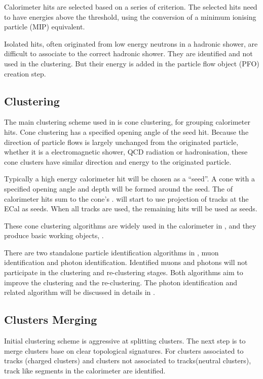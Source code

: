 Calorimeter hits are selected based on a series of criterion. The selected hits need to have energies above the threshold, using the conversion of a minimum ionising particle (MIP) equivalent.

Isolated hits, often originated from low energy neutrons in a hadronic shower, are difficult to associate to the correct hadronic shower. They are identified and not used in the clustering. But their energy is added in the particle flow object (PFO) creation step.

\subsection{Clustering}
\label{sec:pandoraConeClustering}

The main clustering scheme used in \pandora is cone clustering, for grouping calorimeter hits.
Cone clustering has a specified opening angle of the seed hit. Because the direction of particle flows is largely unchanged from the originated particle, whether it is a electromagnetic shower, QCD radiation or hadronisation, these cone clusters have similar direction and energy to the originated particle.

Typically a high energy calorimeter hit will be chosen as a ``seed''. A cone with a specified opening angle and depth will be formed around the seed. The \fourMomentum of calorimeter hits sum to the cone's \fourMomentum. \pandora will start to use projection of tracks at the ECal as seeds. When all tracks are used, the remaining hits will be used as seeds.

These cone clustering algorithms are widely used in the calorimeter in \pandora, and they produce basic working objects, \clusters.

There are two standalone particle identification algorithms in \pandora, muon identification and photon identification. Identified muons and photons will not participate in the clustering and re-clustering stages. Both algorithms aim to improve the clustering and the re-clustering. The photon identification and related algorithm will be discussed in details in \Chapter{}.

\subsection{Clusters Merging}

Initial clustering scheme is aggressive at splitting clusters. The next step is to merge clusters base on clear topological signatures. For clusters associated to tracks (charged clusters) and clusters not associated to tracks(neutral clusters), track like segments in the calorimeter are identified.

